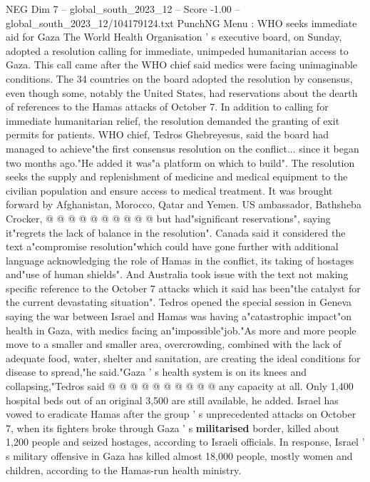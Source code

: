 \begin{textsample}{NEG Dim 7 – global\_south\_2023\_12 – Score -1.00 – global\_south\_2023\_12/104179124.txt}  \label{ex:f7_neg_192}
PunchNG Menu : WHO seeks immediate aid for Gaza The World Health Organisation ' s executive board, on Sunday, adopted a resolution calling for immediate, unimpeded humanitarian access to Gaza.
This call came after the WHO chief said medics were facing unimaginable conditions.
The 34 countries on the board adopted the resolution by consensus, even though some, notably the United States, had reservations about the dearth of references to the Hamas attacks of October 7.
In addition to calling for immediate humanitarian relief, the resolution demanded the granting of exit permits for patients.
WHO chief, Tedros Ghebreyesus, said the board had managed to achieve"the first consensus resolution on the conflict... since it began two months ago."He added it was"a platform on which to build".
The resolution seeks the supply and replenishment of medicine and medical equipment to the civilian population and ensure access to medical treatment.
It was brought forward by Afghanistan, Morocco, Qatar and Yemen.
US ambassador, Bathsheba Crocker, @ @ @ @ @ @ @ @ @ @ but had"significant reservations", saying it"regrets the lack of balance in the resolution".
Canada said it considered the text a"compromise resolution"which could have gone further with additional language acknowledging the role of Hamas in the conflict, its taking of hostages and"use of human shields".
And Australia took issue with the text not making specific reference to the October 7 attacks which it said has been"the catalyst for the current devastating situation".
Tedros opened the special session in Geneva saying the war between Israel and Hamas was having a"catastrophic impact"on health in Gaza, with medics facing an"impossible"job."As more and more people move to a smaller and smaller area, overcrowding, combined with the lack of adequate food, water, shelter and sanitation, are creating the ideal conditions for disease to spread,"he said."Gaza ' s health system is on its knees and collapsing,"Tedros said @ @ @ @ @ @ @ @ @ @ any capacity at all.
Only 1,400 hospital beds out of an original 3,500 are still available, he added.
Israel has vowed to eradicate Hamas after the group ' s unprecedented attacks on October 7, when its fighters broke through Gaza ' s \textbf{militarised} border, killed about 1,200 people and seized hostages, according to Israeli officials.
In response, Israel ' s military offensive in Gaza has killed almost 18,000 people, mostly women and children, according to the Hamas-run health ministry.

\end{textsample}
